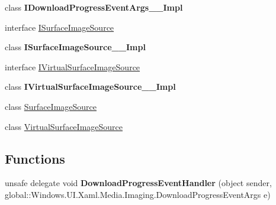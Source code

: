 \begin{DoxyCompactItemize}
class {\bfseries I\+Download\+Progress\+Event\+Args\+\_\+\+\_\+\+Impl}
\item 
interface \hyperlink{interface_windows_1_1_u_i_1_1_xaml_1_1_media_1_1_imaging_1_1_i_surface_image_source}{I\+Surface\+Image\+Source}
\item 
class {\bfseries I\+Surface\+Image\+Source\+\_\+\+\_\+\+Impl}
\item 
interface \hyperlink{interface_windows_1_1_u_i_1_1_xaml_1_1_media_1_1_imaging_1_1_i_virtual_surface_image_source}{I\+Virtual\+Surface\+Image\+Source}
\item 
class {\bfseries I\+Virtual\+Surface\+Image\+Source\+\_\+\+\_\+\+Impl}
\item 
class \hyperlink{class_windows_1_1_u_i_1_1_xaml_1_1_media_1_1_imaging_1_1_surface_image_source}{Surface\+Image\+Source}
\item 
class \hyperlink{class_windows_1_1_u_i_1_1_xaml_1_1_media_1_1_imaging_1_1_virtual_surface_image_source}{Virtual\+Surface\+Image\+Source}
\end{DoxyCompactItemize}
\subsection*{Functions}
\begin{DoxyCompactItemize}
\item 
\mbox{\label{namespace_windows_1_1_u_i_1_1_xaml_1_1_media_1_1_imaging_a86bc4a4b63276ef333a1cbceda745b5f}} 
unsafe delegate void {\bfseries Download\+Progress\+Event\+Handler} (object sender, global\+::\+Windows.\+U\+I.\+Xaml.\+Media.\+Imaging.\+Download\+Progress\+Event\+Args e)
\end{DoxyCompactItemize}
